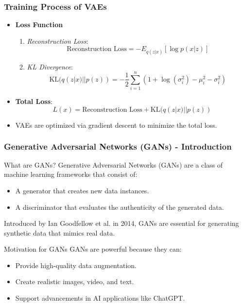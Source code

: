 \documentclass[aspectratio=169]{beamer}
\begin{document}
\begin{frame}[fragile]
    \frametitle{Training Process of VAEs}
    \begin{itemize}
        \item \textbf{Loss Function}
        \begin{enumerate}
            \item \textit{Reconstruction Loss}:
            \begin{equation}
                \text{Reconstruction Loss} = -E_{q(z|x)}[\log p(x|z)]
            \end{equation}
            \item \textit{KL Divergence}:
            \begin{equation}
                \text{KL}(q(z|x) || p(z)) = -\frac{1}{2} \sum_{i=1}^{n} (1 + \log(\sigma_i^2) - \mu_i^2 - \sigma_i^2)
            \end{equation}
        \end{enumerate}
        
        \item \textbf{Total Loss}:
        \begin{equation}
            L(x) = \text{Reconstruction Loss} + \text{KL}(q(z|x) || p(z))
        \end{equation}
        
        \item VAEs are optimized via gradient descent to minimize the total loss.
    \end{itemize}
\end{frame}

\begin{frame}[fragile]
    \frametitle{Generative Adversarial Networks (GANs) - Introduction}
    \begin{block}{What are GANs?}
        Generative Adversarial Networks (GANs) are a class of machine learning frameworks that consist of:
        \begin{itemize}
            \item A generator that creates new data instances.
            \item A discriminator that evaluates the authenticity of the generated data.
        \end{itemize}
        Introduced by Ian Goodfellow et al. in 2014, GANs are essential for generating synthetic data that mimics real data.
    \end{block}
    
    \begin{block}{Motivation for GANs}
        GANs are powerful because they can:
        \begin{itemize}
            \item Provide high-quality data augmentation.
            \item Create realistic images, video, and text.
            \item Support advancements in AI applications like ChatGPT.
        \end{itemize}
    \end{block}
\end{frame}
\end{document}
